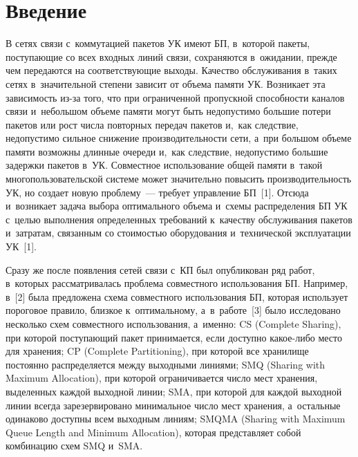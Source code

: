 
  
\vspace*{-6pt}



\thispagestyle{headings}

\begin{multicols}{2}

\label{st\stat}

  \section{Введение }
  
  \vspace*{-4pt}
  
  В сетях связи с~коммутацией пакетов УК имеют 
БП, в~которой пакеты, по\-сту\-па\-ющие со всех входных линий 
связи, сохраняются в~ожидании, преж\-де чем передаются на со\-от\-вет\-ст\-ву\-ющие 
выходы. Качество обслуживания в~таких сетях в~значительной степени зависит 
от объема памяти УК. Возникает эта за\-ви\-си\-мость из-за того, что при 
ограниченной про\-пуск\-ной спо\-соб\-ности каналов связи и~небольшом объеме 
памяти могут быть недопустимо большие потери пакетов или рост чис\-ла 
по\-втор\-ных передач пакетов и,~как следствие, недопустимо силь\-ное снижение 
про\-из\-во\-ди\-тель\-ности сети, а~при большом объеме памяти воз\-мож\-ны длинные 
очереди и,~как следствие, не\-до\-пус\-ти\-мо большие за\-держ\-ки пакетов в~УК. 
Совместное использование общей памяти в~такой многопользовательской 
сис\-те\-ме может значительно повысить про\-из\-во\-ди\-тель\-ность УК, но со\-зда\-ет 
новую проб\-ле\-му~--- требует управ\-ле\-ние БП~[1]. Отсюда и~возникает задача 
выбора оптимального объема и~схемы распределения БП УК с~целью 
выполнения определенных требований к~качеству обслуживания пакетов 
и~за\-тра\-там, связанным со сто\-и\-мостью оборудования и~технической 
эксплуатации УК~[1].
  
  Сразу же после появления сетей связи с~КП был опуб\-ли\-ко\-ван ряд работ, 
в~которых рас\-смат\-ри\-ва\-лась проб\-ле\-ма совместного использования БП.\linebreak 
Например, в~[2] была предложена схема совместного использования БП, 
которая использует пороговое правило, близ\-кое к~оптимальному, 
а~в~работе~[3] было исследовано несколько схем \mbox{совместного} использования, 
а~именно: CS (Complete Sharing), при которой по\-сту\-па\-ющий пакет 
принимается, если до\-ступ\-но ка\-кое-ли\-бо место для хранения; CP (Complete 
Partitioning), при которой все хранилище по\-сто\-ян\-но распределяется между 
выходными линиями; SMQ (Sharing with Maximum Allocation), при которой 
ограничивается чис\-ло мест хранения, выделенных каж\-дой выходной линии; 
SMA, при которой для каж\-дой выходной 
линии всегда зарезервировано минимальное чис\-ло мест хранения, а~остальные 
одинаково до\-ступ\-ны всем выходным линиям; SMQMA (Sharing with Maximum 
Queue Length and Minimum Allocation), которая пред\-став\-ля\-ет собой 
комбинацию схем SMQ и~SMA.
  

\end{multicols}
